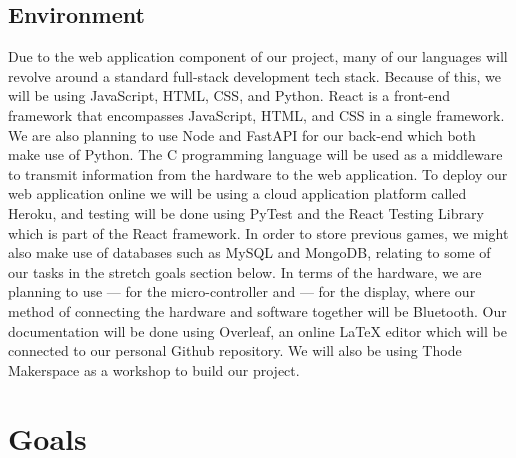 \documentclass{article}
\begin{document}
\subsection{Environment}
Due to the web application component of our project, many of our languages will revolve around a standard full-stack development tech stack. Because of this, we will be using JavaScript, HTML, CSS, and Python. React is a front-end framework that encompasses JavaScript, HTML, and CSS in a single framework. We are also planning to use Node and FastAPI for our back-end which both make use of Python. The C programming language will be used as a middleware to transmit information from the hardware to the web application. To deploy our web application online we will be using a cloud application platform called Heroku, and testing will be done using PyTest and the React Testing Library which is part of the React framework. In order to store previous games, we might also make use of databases such as MySQL and MongoDB, relating to some of our tasks in the stretch goals section below. In terms of the hardware, we are planning to use --- for the micro-controller and --- for the display, where our method of connecting the hardware and software together will be Bluetooth.  Our documentation will be done using Overleaf, an online LaTeX editor which will be connected to our personal Github repository. We will also be using Thode Makerspace as a workshop to build our project.


\section{Goals}
\end{document}
